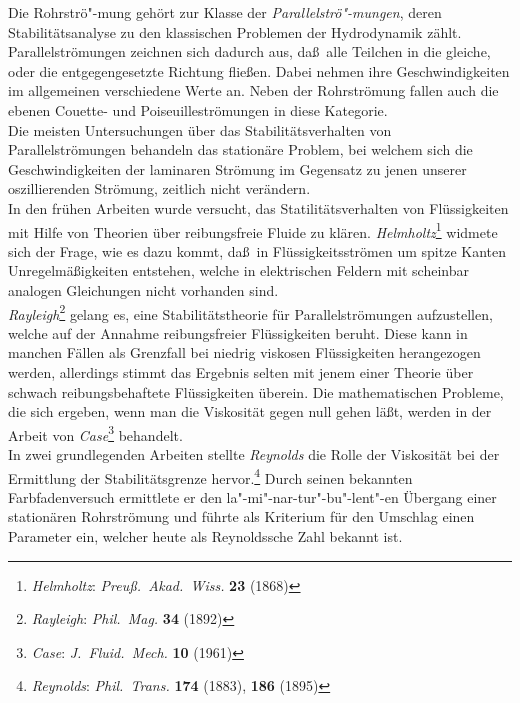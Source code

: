\documentclass[10pt,a5paper,oneside,draft]{book}
\numberwithin{equation}{chapter}
\begin{document}
Die Rohrstr\"o"-mung geh\"ort zur Klasse der \textit{Parallelstr\"o"-mungen}, deren Stabilit\"atsanalyse zu den klassischen Problemen der Hydrodynamik z\"ahlt.
Parallelstr\"omungen zeichnen sich dadurch aus, da\ss\ alle Teilchen in die gleiche, oder die entgegengesetzte Richtung flie\ss en.
Dabei nehmen ihre Geschwindigkeiten im allgemeinen verschiedene Werte an.
Neben der Rohrstr\"omung fallen auch die ebenen Couette- und Poiseuillestr\"omungen in diese Kategorie.\\
Die meisten Untersuchungen \"uber das Stabilit\"atsverhalten von Parallelstr\"omungen behandeln das station\"are Problem, bei welchem sich die Geschwindigkeiten der laminaren Str\"omung im Gegensatz zu jenen unserer oszillierenden Str\"omung, zeitlich nicht ver\"andern.\\
In den fr\"uhen Arbeiten wurde versucht, das Statilit\"atsverhalten von Fl\"ussigkeiten mit Hilfe von Theorien \"uber reibungsfreie Fluide zu kl\"aren.
\textsl{Helmholtz}\footnote{\label{bib:helmholtz_fluessigkeit}\textsl{Helmholtz}: \textit{Preu{\ss}.\ Akad.\ Wiss.} \textbf{23} (1868)}
widmete sich der Frage, wie es dazu kommt, da\ss\ in Fl\"ussigkeitsstr\"omen um spitze Kanten Unregelm\"a\ss igkeiten entstehen, welche in elektrischen Feldern mit scheinbar analogen Gleichungen nicht vorhanden sind.\\
\textsl{Rayleigh}\footnote{\label{bib:rayleigh}\textsl{Rayleigh}: \textit{Phil.\ Mag.} \textbf{34} (1892)}
gelang es, eine Stabilit\"atstheorie f\"ur Parallelstr\"omungen aufzustellen, welche auf der Annahme reibungsfreier Fl\"ussigkeiten beruht.
Diese kann in manchen F\"allen als Grenzfall bei niedrig viskosen Fl\"ussigkeiten herangezogen werden, allerdings stimmt das Ergebnis selten mit jenem einer Theorie \"uber schwach reibungsbehaftete Fl\"ussigkeiten \"uberein.
Die mathematischen Probleme, die sich ergeben, wenn man die Viskosit\"at gegen null gehen l\"a\ss t, werden in der Arbeit von \textsl{Case}\footnote{\label{bib:case2}\textsl{Case}: \textit{J.\ Fluid.\ Mech.} \textbf{10} (1961)}
behandelt.\\
In zwei grundlegenden Arbeiten stellte \textsl{Reynolds} die Rolle der Viskosit\"at bei der Ermittlung der Stabilit\"atsgrenze hervor.\footnote{\label{bib:reynolds_experiment}\textsl{Reynolds}: \textit{Phil.\ Trans.} \textbf{174} (1883), \label{bib:reynolds_criterion}\textbf{186} (1895)}
Durch seinen bekannten Farbfadenversuch ermittlete er den la"-mi"-nar-tur"-bu"-lent"-en \"Ubergang einer station\"aren Rohrstr\"omung und f\"uhrte als Kriterium f\"ur den Umschlag einen Parameter ein, welcher heute als Reynoldssche Zahl bekannt ist.
\end{document}

